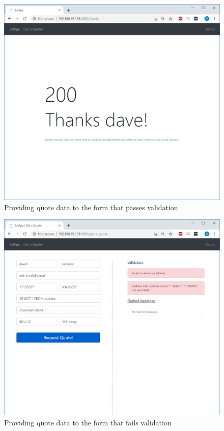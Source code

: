 \pagebreak
\begin{figure}[h!]
\centering
\captionsetup{skip=\skipfigurecaptionlen}
\includegraphics[width=1\textwidth]{screenshots/salapp1.png}
\caption{Providing quote data to the form that passes validation}
\label{fig:salapp1}
\end{figure}

\pagebreak
\begin{figure}[h!]
\centering
\captionsetup{skip=\skipfigurecaptionlen}
\includegraphics[width=1\textwidth]{screenshots/salapp2.png}
\caption{Providing quote data to the form that fails validation}
\label{fig:salapp2}
\end{figure}

